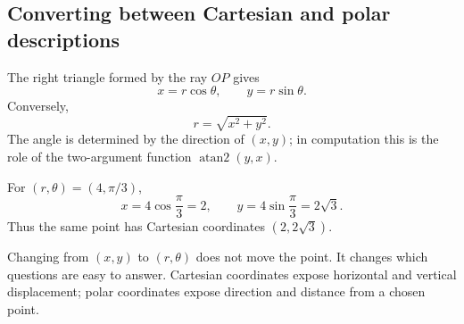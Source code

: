 \subsection{Converting between Cartesian and polar descriptions}

The right triangle formed by the ray $OP$ gives
\[
\boxed{x=r\cos\theta,\qquad y=r\sin\theta}.
\]
Conversely,
\[
\boxed{r=\sqrt{x^2+y^2}}.
\]
The angle is determined by the direction of $(x,y)$; in computation this is the
role of the two-argument function $\operatorname{atan2}(y,x)$.

\begin{center}
\end{center}

\begin{examplebox}
For $(r,\theta)=(4,\pi/3)$,
\[
x=4\cos\frac\pi3=2,
\qquad
y=4\sin\frac\pi3=2\sqrt3.
\]
Thus the same point has Cartesian coordinates $(2,2\sqrt3)$.
\end{examplebox}

\begin{corebox}
Changing from $(x,y)$ to $(r,\theta)$ does not move the point. It changes which
questions are easy to answer. Cartesian coordinates expose horizontal and
vertical displacement; polar coordinates expose direction and distance from a
chosen point.
\end{corebox}
